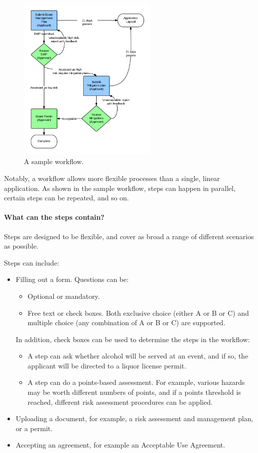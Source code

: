 \documentclass[12pt,a4paper,twosided]{article}
\begin{document}
\begin{figure}[h!]
  \centering
  \includegraphics[width=0.6\textwidth]{sample-workflow.png}  
  \caption{A sample workflow.}
  \label{fig:sample-workflow}
\end{figure}

Notably, a workflow allows more flexible processes than a single, linear application. As shown in the sample workflow, steps can happen in parallel, certain steps can be repeated, and so on.

\paragraph{What can the steps contain?}

Steps are designed to be flexible, and cover as broad a range of different scenarios as possible.

Steps can include:
\begin{itemize}
\item Filling out a form. Questions can be:
  \begin{itemize}
  \item Optional or mandatory.
  \item Free text or check boxes. Both exclusive choice (either A or B or C) and multiple choice (any combination of A or B or C) are supported. 
  \end{itemize}

  In addition, check boxes can be used to determine the steps in the workflow:
  \begin{itemize}
  \item A step can ask whether alcohol will be served at an event, and if so, the applicant will be directed to a liquor license permit.
  \item A step can do a points-based assessment. For example, various hazards may be worth different numbers of points, and if a points threshold is reached, different risk assessment procedures can be applied.
  \end{itemize}
\item Uploading a document, for example, a risk assessment and management plan, or a permit.
\item Accepting an agreement, for example an Acceptable Use Agreement.
\end{itemize}
\end{document}
